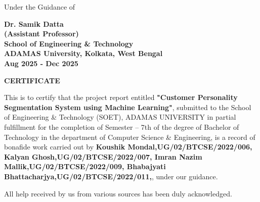 \documentclass[12pt,a4paper]{report}
\begin{document}
\begin{center}
    \vspace{1cm}
    
{\fontsize{12}{14}\selectfont Under the Guidance of}\\
    \vspace{0cm}

    {\fontsize{12}{16}\selectfont\textbf{Dr. Samik Datta}} \\
    {\fontsize{12}{14}\selectfont\textbf{(Assistant Professor)}}\\

    \vspace{1cm}
    {\fontsize{12}{16}\selectfont\textbf{School of Engineering \& Technology}}\\
    {\fontsize{12}{16}\selectfont\textbf{ADAMAS University, Kolkata, West Bengal}}\\
    \vspace{0.2cm}
    {\fontsize{12}{14}\selectfont\textbf{Aug 2025 - Dec 2025}}
\end{center}
\newpage


\thispagestyle{plain}
\begin{center}
    \Large{\fontsize{14}{16}\selectfont\textbf{CERTIFICATE}}
\end{center}
\vspace{1.5cm}
\noindent This is to certify that the project report entitled \textbf{"Customer Personality Segmentation System using Machine Learning"}, submitted to the School of Engineering \& Technology (SOET), ADAMAS UNIVERSITY in partial fulfillment for the completion of Semester – 7th of the degree of Bachelor of Technology in the department of Computer Science \& Engineering, is a record of bonafide work carried out by \textbf{ Koushik Mondal,UG/02/BTCSE/2022/006, Kalyan Ghosh,UG/02/BTCSE/2022/007, Imran Nazim Mallik,UG/02/BTCSE/2022/009, Bhabajyati Bhattacharjya,UG/02/BTCSE/2022/011,}, under our guidance.
\vspace{1cm}

\noindent All help received by us from various sources has been duly acknowledged.
\end{document}
